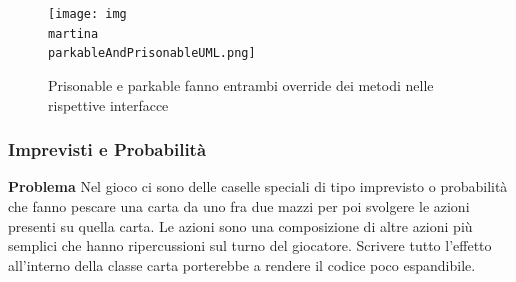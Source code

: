 \begin{figure}[h]
    \centering
    \texttt{[image: img\\martina\\parkableAndPrisonableUML.png]}
    \caption{Prisonable e parkable fanno entrambi override dei metodi nelle rispettive interfacce}
    \label{img:parkableAndPrisonableUML}
\end{figure}

\subsubsection{Imprevisti e Probabilità}

\textbf{Problema}\newline
Nel gioco ci sono delle caselle speciali di tipo imprevisto o probabilità che fanno pescare una carta da uno fra due mazzi per poi svolgere le azioni presenti su quella carta.
Le azioni sono una composizione di altre azioni più semplici che hanno ripercussioni sul turno del giocatore.
Scrivere tutto l’effetto all’interno della classe carta porterebbe a rendere il codice poco espandibile.

